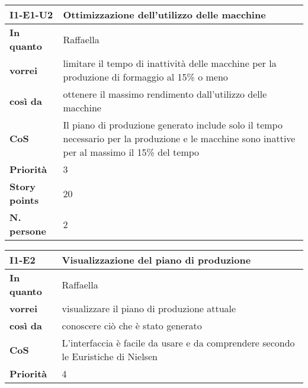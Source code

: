 \begin{table}[H]
  \begin{tabularx}{\textwidth}{lX}
    \toprule
    \textbf{I1-E1-U2} & \textbf{Ottimizzazione dell'utilizzo delle macchine} \\
    \midrule
    \textbf{In quanto} & Raffaella \\
    \textbf{vorrei} & limitare il tempo di inattività delle macchine per la produzione di formaggio al 15\% o meno \\
    \textbf{così da} & ottenere il massimo rendimento dall'utilizzo delle macchine \\
    \midrule
    \textbf{CoS} & Il piano di produzione generato include solo il tempo necessario per la produzione e le macchine sono inattive per al massimo il 15\% del tempo \\
    \midrule
    \textbf{Priorità} & 3 \\
    \textbf{Story points} & 20 \\
    \textbf{N. persone} & 2 \\
    \bottomrule
  \end{tabularx}
  \label{user-story:i1-e1-u2}
\end{table}

\begin{table}[H]
  \begin{tabularx}{\textwidth}{lX}
    \toprule
    \textbf{I1-E2} & \textbf{Visualizzazione del piano di produzione} \\
    \midrule
    \textbf{In quanto} & Raffaella \\
    \textbf{vorrei} & visualizzare il piano di produzione attuale \\
    \textbf{così da} & conoscere ciò che è stato generato \\
    \midrule
    \textbf{CoS} & L'interfaccia è facile da usare e da comprendere secondo le Euristiche di Nielsen~\cite{cit:nielsen} \\
    \midrule
    \textbf{Priorità} & 4 \\
    \bottomrule
  \end{tabularx}
  \label{user-story:i1-e2}
\end{table}

